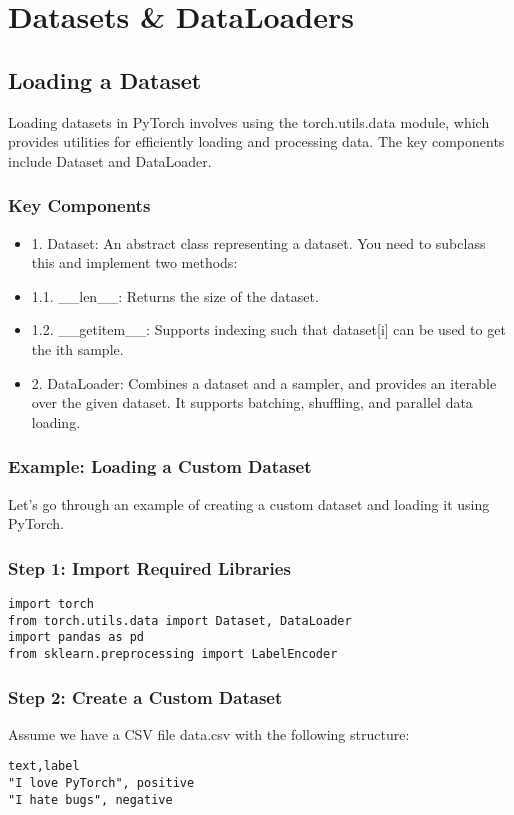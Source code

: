 \documentclass{article}
\begin{document}
\section{Datasets \& DataLoaders}

\subsection{Loading a Dataset}

Loading datasets in PyTorch involves using the torch.utils.data module, which provides utilities for efficiently loading and processing data. The key components 
include Dataset and DataLoader.
\subsubsection{Key Components}

\begin{itemize}
    \item 1. Dataset: An abstract class representing a dataset. You need to subclass this and implement two methods:
    \item 1.1. \_\_len\_\_: Returns the size of the dataset.
    \item 1.2. \_\_getitem\_\_: Supports indexing such that dataset[i] can be used to get the ith sample.
    \item 2. DataLoader: Combines a dataset and a sampler, and provides an iterable over the given dataset. It supports batching, shuffling, and parallel data loading.
\end{itemize}

\subsubsection{Example: Loading a Custom Dataset}
Let's go through an example of creating a custom dataset and loading it using PyTorch.

\subsubsection{Step 1: Import Required Libraries}

\begin{lstlisting}
import torch
from torch.utils.data import Dataset, DataLoader
import pandas as pd
from sklearn.preprocessing import LabelEncoder

\end{lstlisting}

\subsubsection{Step 2: Create a Custom Dataset}
Assume we have a CSV file data.csv with the following structure:
\begin{lstlisting}
text,label
"I love PyTorch", positive
"I hate bugs", negative

\end{lstlisting}
\end{document}
